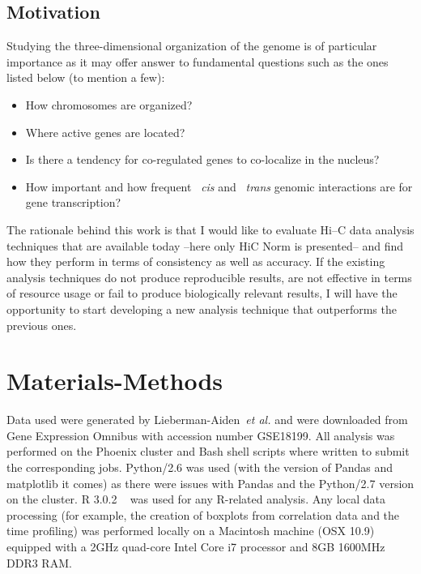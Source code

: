 \documentclass[a4paper, 11pt]{article} %
\begin{document}
\subsection*{Motivation}

Studying the three-dimensional organization of the genome is of particular importance as it may offer answer to fundamental questions such as the ones listed below (to mention a few):

\begin{itemize}
\item How chromosomes are organized?
\item Where active genes are located?
\item Is there a tendency for co-regulated genes to co-localize in the nucleus?
\item How important and how frequent ~\emph{cis} and ~\emph{trans} genomic
interactions are for gene transcription?
\end{itemize}

The rationale behind this work is that I would like to evaluate
Hi--C data analysis techniques that are available today --here only HiC
Norm is presented-- and find how they perform in terms of consistency
as well as accuracy. If the existing analysis techniques do not
produce reproducible results, are not effective in terms of resource
usage or fail to produce biologically relevant results, I will have
the opportunity to start developing a new analysis technique that
outperforms the previous ones. 



\section*{Materials-Methods}

Data used were generated by Lieberman-Aiden~\emph{et al.} 
\cite{LiebermanAiden:2009jz} and were downloaded from Gene Expression Omnibus with accession number GSE18199. All analysis was performed
on the Phoenix cluster and Bash shell scripts where written
to submit the corresponding jobs. Python/2.6 was used (with the
version of Pandas and matplotlib it comes) as there were issues
with Pandas and the Python/2.7 version on the cluster. R 3.0.2 ~\cite{R:stats} was used for any R-related analysis. Any local data processing
(for example, the creation of boxplots from correlation data and
the time profiling) was performed locally on a Macintosh machine 
(OSX 10.9) equipped with a 2GHz quad-core Intel Core i7 processor
and 8GB 1600MHz DDR3 RAM. 
\end{document}
